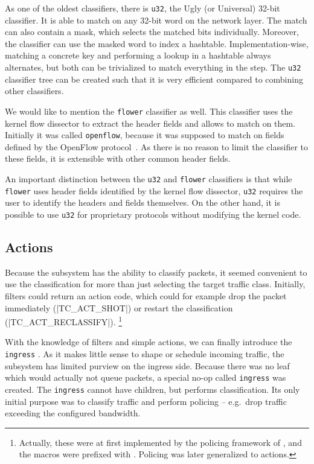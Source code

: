 As one of the oldest classifiers, there is \texttt{u32}, the Ugly (or
Universal) 32-bit classifier. It is able to match on any 32-bit word on the
network layer. The match can also contain a mask, which selects the matched bits
individually. Moreover, the classifier can use the masked word to index
a hashtable. Implementation-wise, matching a concrete key and performing
a lookup in a hashtable always alternates, but both can be trivialized to match everything in the step.
The \texttt{u32} classifier tree can be created such that it is very efficient
compared to combining other classifiers.

We would like to mention the \texttt{flower} classifier as well. This
classifier uses the kernel flow dissector to extract the header fields and allows
to match on them. Initially it was called \texttt{openflow}, because it was
supposed to match on fields defined by the OpenFlow protocol~\cite{openflow}. As
there is no reason to limit the classifier to these fields, it is extensible with
other common header fields.

An important distinction between the \texttt{u32} and \texttt{flower}
classifiers is that while \texttt{flower} uses
header fields identified by the kernel flow dissector, \texttt{u32} requires the
user to identify the headers and fields themselves. On the other hand, it is
possible to use \texttt{u32} for proprietary protocols without modifying the
kernel code.

\subsection{Actions}

Because the  subsystem has the ability to classify packets, it seemed convenient to
use the classification for more than just selecting the target traffic class.
Initially, filters could return an action code, which could for example drop the
packet immediately (\macro|TC_ACT_SHOT|) or restart the classification
(\macro|TC_ACT_RECLASSIFY|).
\footnote{Actually, these were at first implemented by the policing framework of
, and the macros were prefixed with . Policing was
later generalized to actions.}

With the knowledge of filters and simple actions, we can finally introduce the
\texttt{ingress} \qdisc. As it makes little sense to shape or schedule incoming
traffic, the  subsystem has limited purview on the ingress side.
Because there was no leaf \qdisc{} which would actually not queue packets,
a special no-op \qdisc{} called \texttt{ingress} was created.
The \texttt{ingress} \qdisc{} cannot have children, but performs
classification. Its only initial purpose was to classify traffic and perform policing
-- e.g.~drop traffic exceeding the configured bandwidth.

